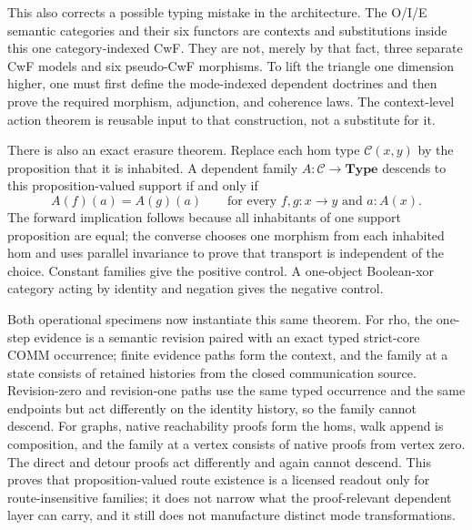 \documentclass[11pt]{article}
\theoremstyle{definition}
\theoremstyle{remark}
\begin{document}
This also corrects a possible typing mistake in the architecture.  The O/I/E
semantic categories and their six functors are contexts and substitutions
inside this one category-indexed CwF.  They are not, merely by that fact, three
separate CwF models and six pseudo-CwF morphisms.  To lift the triangle one
dimension higher, one must first define the mode-indexed dependent doctrines
and then prove the required morphism, adjunction, and coherence laws.  The
context-level action theorem is reusable input to that construction, not a
substitute for it.

There is also an exact erasure theorem.  Replace each hom type
$\mathcal C(x,y)$ by the proposition that it is inhabited.  A dependent family
$A:\mathcal C\to\mathbf{Type}$ descends to this proposition-valued support if
and only if
\[
  A(f)(a)=A(g)(a)
  \qquad
  \text{for every }f,g:x\to y\text{ and }a:A(x).
\]
The forward implication follows because all inhabitants of one support
proposition are equal; the converse chooses one morphism from each inhabited
hom and uses parallel invariance to prove that transport is independent of the
choice.  Constant families give the positive control.  A one-object
Boolean-xor category acting by identity and negation gives the negative
control.

Both operational specimens now instantiate this same theorem.  For rho, the
one-step evidence is a semantic revision paired with an exact typed strict-core
COMM occurrence; finite evidence paths form the context, and the family at a
state consists of retained histories from the closed communication source.
Revision-zero and revision-one paths use the same typed occurrence and the
same endpoints but act differently on the identity history, so the family
cannot descend.  For graphs, native reachability proofs form the homs, walk
append is composition, and the family at a vertex consists of native proofs
from vertex zero.  The direct and detour proofs act differently and again
cannot descend.  This proves that proposition-valued route existence is a
licensed readout only for route-insensitive families; it does not narrow what
the proof-relevant dependent layer can carry, and it still does not manufacture
distinct mode transformations.
\end{document}
